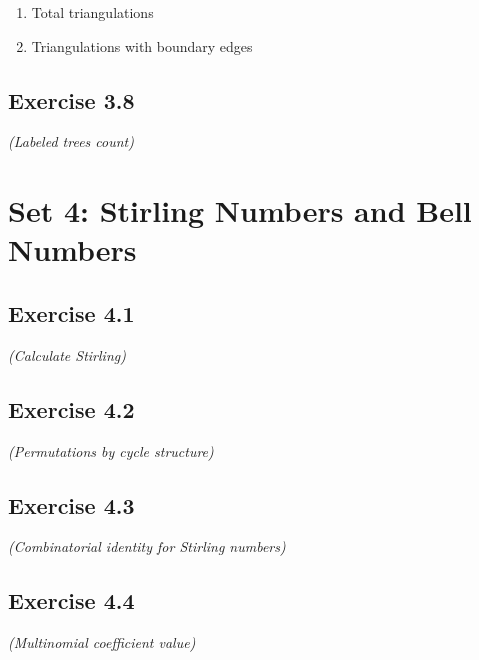 \documentclass[12pt,a4paper]{article}
\begin{document}
\begin{enumerate}[label=(\roman*)]
\item Total triangulations
\vspace{1cm}

\item Triangulations with boundary edges
\vspace{1cm}
\end{enumerate}

\subsection*{Exercise 3.8}
\textit{(Labeled trees count)}

\vspace{1cm}

\section{Set 4: Stirling Numbers and Bell Numbers}

\subsection*{Exercise 4.1}
\textit{(Calculate Stirling)}

\vspace{1cm}

\subsection*{Exercise 4.2}
\textit{(Permutations by cycle structure)}

\vspace{1cm}

\subsection*{Exercise 4.3}
\textit{(Combinatorial identity for Stirling numbers)}

\vspace{1cm}

\subsection*{Exercise 4.4}
\textit{(Multinomial coefficient value)}

\vspace{1cm}
\end{document}
